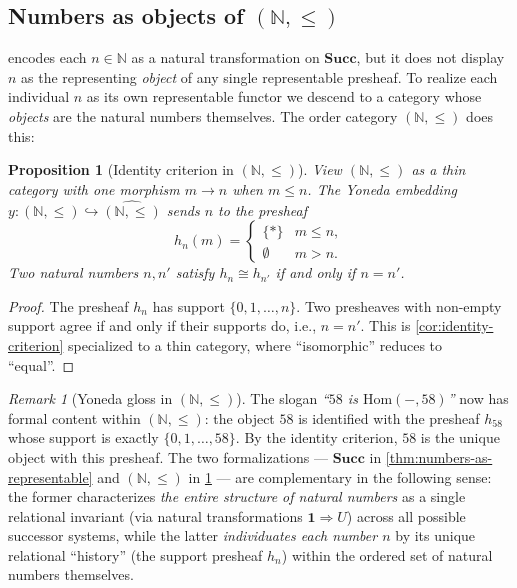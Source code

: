 \documentclass[12pt]{article}
\newtheorem{proposition}[theorem]{Proposition}
\theoremstyle{definition}
\theoremstyle{remark}
\newtheorem{remark}[theorem]{Remark}
\begin{document}
\subsection{Numbers as objects of \texorpdfstring{$(\mathbb{N}, \le)$}{(N, <=)}}

 encodes each $n \in \mathbb{N}$ as a natural transformation on $\mathbf{Succ}$, but it does not display $n$ as the representing \emph{object} of any single representable presheaf. To realize each individual $n$ as its own representable functor we descend to a category whose \emph{objects} are the natural numbers themselves. The order category $(\mathbb{N}, \le)$ does this:

\begin{proposition}[Identity criterion in $(\mathbb{N}, \le)$]
\label{prop:order-identity-criterion}
View $(\mathbb{N}, \le)$ as a thin category with one morphism $m \to n$ when $m \le n$. The Yoneda embedding $y\colon (\mathbb{N}, \le) \hookrightarrow \widehat{(\mathbb{N}, \le)}$ sends $n$ to the presheaf
\[
h_{n}(m) = \begin{cases} \{*\} & m \le n, \\ \emptyset & m > n.\end{cases}
\]
Two natural numbers $n, n'$ satisfy $h_n \cong h_{n'}$ if and only if $n = n'$.
\end{proposition}

\begin{proof}
The presheaf $h_n$ has support $\{0, 1, \ldots, n\}$. Two presheaves with non-empty support agree if and only if their supports do, i.e., $n = n'$. This is \cref{cor:identity-criterion} specialized to a thin category, where ``isomorphic'' reduces to ``equal''.
\end{proof}

\begin{remark}[Yoneda gloss in $(\mathbb{N}, \le)$]
The slogan \emph{``$58$ is $\mathrm{Hom}(-, 58)$''} now has formal content within $(\mathbb{N}, \le)$: the object $58$ is identified with the presheaf $h_{58}$ whose support is exactly $\{0, 1, \ldots, 58\}$. By the identity criterion, $58$ is the unique object with this presheaf. The two formalizations --- $\mathbf{Succ}$ in \cref{thm:numbers-as-representable} and $(\mathbb{N}, \le)$ in \cref{prop:order-identity-criterion} --- are complementary in the following sense: the former characterizes \emph{the entire structure of natural numbers} as a single relational invariant (via natural transformations $\mathbf{1} \Rightarrow U$) across all possible successor systems, while the latter \emph{individuates each number $n$} by its unique relational ``history'' (the support presheaf $h_n$) within the ordered set of natural numbers themselves.
\end{remark}
\end{document}
